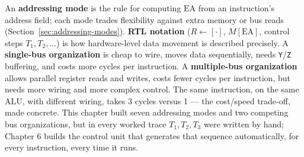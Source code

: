 \documentclass[11pt]{article}
\begin{document}
An \textbf{addressing mode} is the rule for computing $\text{EA}$ from an instruction's address field; each mode trades flexibility against extra memory or bus reads (Section~\ref{sec:addressing-modes}). \textbf{RTL notation} ($R \gets [\cdot]$, $M[\text{EA}]$, control steps $T_1, T_2, \dots$) is how hardware-level data movement is described precisely. A \textbf{single-bus organization} is cheap to wire, moves data sequentially, needs \texttt{Y}/\texttt{Z} buffering, and costs more cycles per instruction. A \textbf{multiple-bus organization} allows parallel register reads and writes, costs fewer cycles per instruction, but needs more wiring and more complex control. The same instruction, on the same ALU, with different wiring, takes 3 cycles versus 1 --- the cost/speed trade-off, made concrete. This chapter built seven addressing modes and two competing bus organizations, but in every worked trace $T_1, T_2, T_3$ were written by hand; Chapter 6 builds the control unit that generates that sequence automatically, for every instruction, every time it runs.



\end{document}
